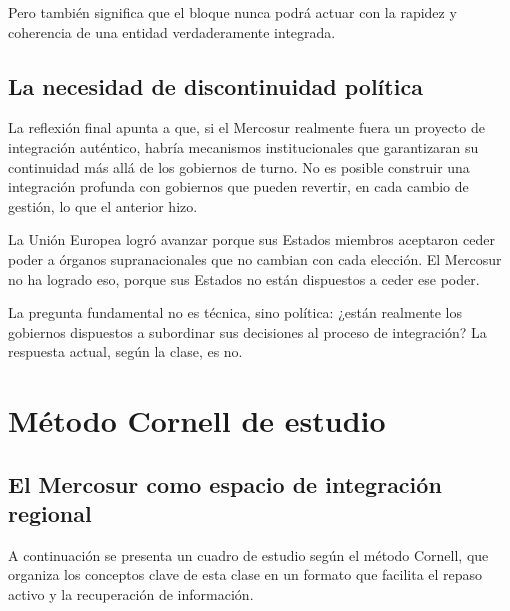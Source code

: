\documentclass[12pt,oneside]{book}
\begin{document}
Pero también significa que el bloque nunca podrá actuar con la rapidez y coherencia de una entidad verdaderamente integrada.

\section{La necesidad de discontinuidad política}

La reflexión final apunta a que, si el Mercosur realmente fuera un proyecto de integración auténtico, habría mecanismos institucionales que garantizaran su continuidad más allá de los gobiernos de turno. No es posible construir una integración profunda con gobiernos que pueden revertir, en cada cambio de gestión, lo que el anterior hizo.

La Unión Europea logró avanzar porque sus Estados miembros aceptaron ceder poder a órganos supranacionales que no cambian con cada elección. El Mercosur no ha logrado eso, porque sus Estados no están dispuestos a ceder ese poder.

\begin{important}
La pregunta fundamental no es técnica, sino política: ¿están realmente los gobiernos dispuestos a subordinar sus decisiones al proceso de integración? La respuesta actual, según la clase, es no.
\end{important}

\chapter*{Método Cornell de estudio}

\section*{El Mercosur como espacio de integración regional}

A continuación se presenta un cuadro de estudio según el método Cornell, que organiza los conceptos clave de esta clase en un formato que facilita el repaso activo y la recuperación de información.
\end{document}
